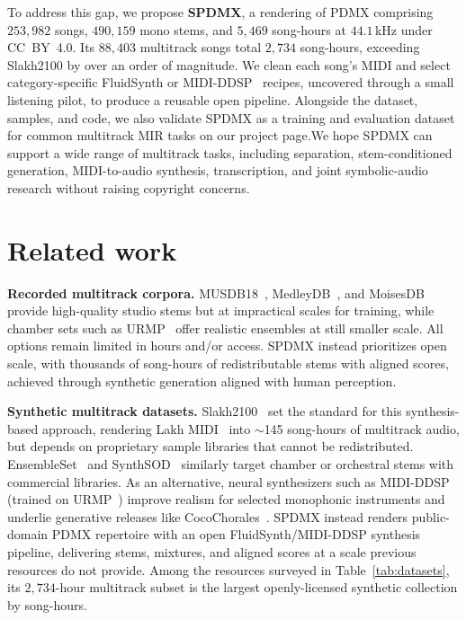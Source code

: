 \documentclass{article}
\begin{document}
To address this gap, we propose \textbf{SPDMX}, a rendering of PDMX comprising $253{,}982$ songs, $490{,}159$ mono stems, and $5{,}469$ song-hours at $44.1$\,kHz under CC~BY~4.0.
Its $88{,}403$ multitrack songs total $2{,}734$ song-hours, exceeding Slakh2100 by over an order of magnitude.
We clean each song's MIDI and select category-specific FluidSynth or MIDI-DDSP~\cite{wu2022midi} recipes, uncovered through a small listening pilot, to produce a reusable open pipeline.
Alongside the dataset, samples, and code, we also validate SPDMX as a training and evaluation dataset for common multitrack MIR tasks on our project page.\footnotemark[1]
We hope SPDMX can support a wide range of multitrack tasks, including separation, stem-conditioned generation, MIDI-to-audio synthesis, transcription, and joint symbolic-audio research without raising copyright concerns.

\section{Related work}
\label{sec:prior}

\noindent\textbf{Recorded multitrack corpora.}
MUSDB18~\cite{rafii2019musdb18}, MedleyDB~\cite{bittner2014medleydb,bittner2016medleydb}, and MoisesDB~\cite{pereira2023moisesdb} provide high-quality studio stems but at impractical scales for training, while chamber sets such as URMP~\cite{li2018creating} offer realistic ensembles at still smaller scale.
All options remain limited in hours and/or access.
SPDMX instead prioritizes open scale, with thousands of song-hours of redistributable stems with aligned scores, achieved through synthetic generation aligned with human perception.

\noindent\textbf{Synthetic multitrack datasets.}
Slakh2100~\cite{manilow2019cutting} set the standard for this synthesis-based approach, rendering Lakh MIDI~\cite{raffel2016learning} into $\sim$145 song-hours of multitrack audio, but depends on proprietary sample libraries that cannot be redistributed.
EnsembleSet~\cite{sarkar2022ensembleset} and SynthSOD~\cite{garcia2025synthsod} similarly target chamber or orchestral stems with commercial libraries.
As an alternative, neural synthesizers such as MIDI-DDSP~\cite{wu2022midi} (trained on URMP~\cite{li2018creating}) improve realism for selected monophonic instruments and underlie generative releases like CocoChorales~\cite{wu2022chamber}. 
SPDMX instead renders public-domain PDMX repertoire with an open FluidSynth/MIDI-DDSP synthesis pipeline, delivering stems, mixtures, and aligned scores at a scale previous resources do not provide.
Among the resources surveyed in Table~\ref{tab:datasets}, its $2{,}734$-hour multitrack subset is the largest openly-licensed synthetic collection by song-hours.
\end{document}
